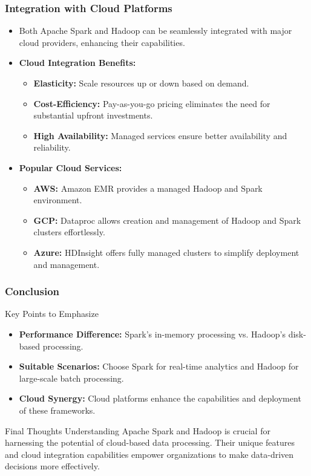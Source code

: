 \documentclass{beamer}
\begin{document}
\begin{frame}[fragile]
    \frametitle{Integration with Cloud Platforms}
    \begin{itemize}
        \item Both Apache Spark and Hadoop can be seamlessly integrated with major cloud providers, enhancing their capabilities.
        
        \item \textbf{Cloud Integration Benefits:}
            \begin{itemize}
                \item \textbf{Elasticity:} Scale resources up or down based on demand.
                \item \textbf{Cost-Efficiency:} Pay-as-you-go pricing eliminates the need for substantial upfront investments.
                \item \textbf{High Availability:} Managed services ensure better availability and reliability.
            \end{itemize}
        
        \item \textbf{Popular Cloud Services:}
            \begin{itemize}
                \item \textbf{AWS:} Amazon EMR provides a managed Hadoop and Spark environment.
                \item \textbf{GCP:} Dataproc allows creation and management of Hadoop and Spark clusters effortlessly.
                \item \textbf{Azure:} HDInsight offers fully managed clusters to simplify deployment and management.
            \end{itemize}
    \end{itemize}
\end{frame}

\begin{frame}[fragile]
    \frametitle{Conclusion}
    \begin{block}{Key Points to Emphasize}
        \begin{itemize}
            \item \textbf{Performance Difference:} Spark's in-memory processing vs. Hadoop's disk-based processing.
            \item \textbf{Suitable Scenarios:} Choose Spark for real-time analytics and Hadoop for large-scale batch processing.
            \item \textbf{Cloud Synergy:} Cloud platforms enhance the capabilities and deployment of these frameworks.
        \end{itemize}
    \end{block}
    
    \begin{block}{Final Thoughts}
        Understanding Apache Spark and Hadoop is crucial for harnessing the potential of cloud-based data processing. Their unique features and cloud integration capabilities empower organizations to make data-driven decisions more effectively.
    \end{block}
\end{frame}
\end{document}
